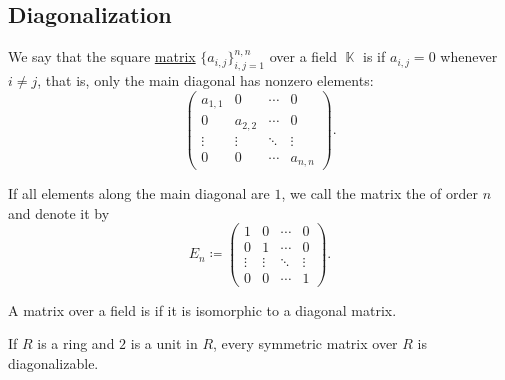\subsection{Diagonalization}\label{subsec:diagonalization}

\begin{definition}\label{def:diagonal_matrix}
  We say that the square \hyperref[def:array/matrix]{matrix} \( \{ a_{i,j} \}_{i,j=1}^{n,n} \) over a field \( \BbbK \) is  if \( a_{i,j} = 0 \) whenever \( i \neq j \), that is, only the main diagonal has nonzero elements:
  \begin{equation*}
    \begin{pmatrix}
      a_{1,1} & 0       & \cdots & 0       \\
      0       & a_{2,2} & \cdots & 0       \\
      \vdots  & \vdots  & \ddots & \vdots  \\
      0       & 0       & \cdots & a_{n,n}
    \end{pmatrix}.
  \end{equation*}

  If all elements along the main diagonal are \( 1 \), we call the matrix the  of order \( n \) and denote it by
  \begin{equation*}
    E_n \coloneqq
    \begin{pmatrix}
      1      & 0      & \cdots & 0      \\
      0      & 1      & \cdots & 0      \\
      \vdots & \vdots & \ddots & \vdots \\
      0      & 0      & \cdots & 1
    \end{pmatrix}.
  \end{equation*}
\end{definition}

\begin{definition}\label{def:diagonalizable_matrix}
  A matrix over a field is  if it is isomorphic to a diagonal matrix.
\end{definition}

\begin{theorem}\label{def:spectral_theorem_for_matrices}\mcite\cite[thm. 6.5]{Knapp2016BasicAlgebra}
  If \( R \) is a ring and \( 2 \) is a unit in \( R \), every symmetric matrix over \( R \) is diagonalizable.
\end{theorem}
